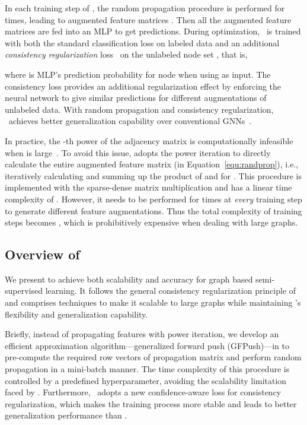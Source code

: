 In each training step of \grand, the random propagation procedure is performed for  times, leading to  augmented feature matrices . 
Then all the augmented feature matrices are fed into an MLP to get  predictions. 
During optimization, \grand\ is trained with both the standard classification loss on labeled data and an additional \textit{consistency regularization} loss~\cite{berthelot2019mixmatch} on the unlabeled node set , that is, 

where  is MLP's prediction probability for node  when using  as input. 
The consistency loss provides an additional regularization effect by enforcing the neural network to give similar predictions for different augmentations of unlabeled data.
With random propagation and consistency regularization, \grand\ achieves better generalization capability over conventional GNNs~\cite{feng2020grand}.




In practice, the -th power of the adjacency matrix  is computationally infeasible when  is large~\cite{qiu2018network}. 
To avoid this issue, \grand adopts the power iteration to directly calculate the entire augmented feature matrix  (in Equation~\ref{equ:randprop}), i.e., iteratively calculating and summing up the product of  and  for . This procedure is implemented with the sparse-dense matrix multiplication and has a linear time complexity of . However, it needs to be performed for  times at \textit{every} training step to generate different feature augmentations. 
Thus the total complexity of  training steps becomes , which is prohibitively expensive when dealing with large graphs.



\subsection{Overview of \model}
\label{sec:overview}


We present \model to 
achieve both scalability and accuracy for graph based semi-supervised learning. 
It follows the general consistency regularization principle of \grand and  
comprises techniques to make it scalable to large graphs 
while maintaining \grand's flexibility and generalization capability. 


Briefly, instead of propagating features with power iteration, 
we develop an efficient approximation algorithm---generalized forward push (GFPush)---in \model to pre-compute the required row vectors of propagation matrix and perform random propagation in a mini-batch manner. 
The time complexity of this procedure is controlled by a predefined hyperparameter, avoiding the scalability limitation faced by \grand. 
Furthermore, \model\ adopts a new confidence-aware loss for consistency regularization, which makes the training process more stable and leads to better generalization performance than \grand. 



